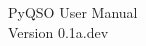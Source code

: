 \documentclass[11pt, a4paper]{book}
\begin{document}
\begin{titlepage}
\begin{center}
\vspace*{5cm}
\huge{PyQSO User Manual}\\\vspace*{5cm}
\LARGE{Version 0.1a.dev}
\end{center}
\end{titlepage}

\tableofcontents



\end{document}

